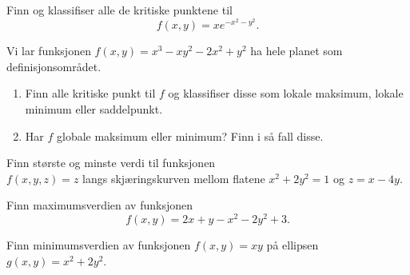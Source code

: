 \oppgave[K2013, Oppgave 3] Finn og klassifiser alle de kritiske punktene til
%
\begin{equation*}
  f(x,y) = xe^{-x^2-y^2}.
\end{equation*}


\oppgave[V2013, Oppgave 4] Vi lar funksjonen $f(x,y) = x^3 - xy^2 - 2x^2 + y^2$
ha hele planet som definisjonsområdet.
%
\begin{enumerate}
  \item Finn alle kritiske punkt til $f$ og klassifiser disse som lokale
    maksimum, lokale minimum eller saddelpunkt.
  \item Har $f$ globale maksimum eller minimum? Finn i så fall disse. 
\end{enumerate}

\oppgave[K2012, Oppgave 2] Finn største og minste verdi til funksjonen \\ $f(x,y,z)
= z$ langs skjæringskurven mellom flatene $x^2 + 2y^2 = 1$ og $z = x - 4y$.


\oppgave[V2012, Oppgave 3] Finn maximumsverdien av funksjonen
%
\begin{equation*}
  f(x,y) = 2x + y - x^2 - 2y^2 + 3.
\end{equation*}


\oppgave[V2012, Oppgave 6] Finn minimumsverdien av funksjonen $f(x,y) = xy$ på
ellipsen $g(x,y) = x^2 + 2y^2 $.




